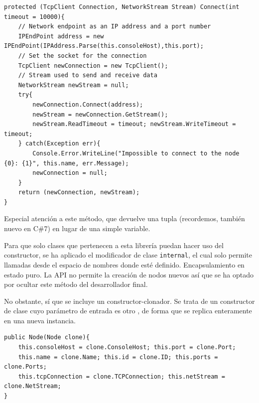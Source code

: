 \begin{lstlisting}[language={[Sharp]C}, caption={Establecimiento de la conexión con el nodo}, label={node2}]
protected (TcpClient Connection, NetworkStream Stream) Connect(int timeout = 10000){
    // Network endpoint as an IP address and a port number
    IPEndPoint address = new IPEndPoint(IPAddress.Parse(this.consoleHost),this.port);
    // Set the socket for the connection
    TcpClient newConnection = new TcpClient();
    // Stream used to send and receive data
    NetworkStream newStream = null;
    try{
        newConnection.Connect(address);
        newStream = newConnection.GetStream();
        newStream.ReadTimeout = timeout; newStream.WriteTimeout = timeout;
    } catch(Exception err){
        Console.Error.WriteLine("Impossible to connect to the node {0}: {1}", this.name, err.Message);
        newConnection = null;
    }
    return (newConnection, newStream);
}
\end{lstlisting}

Especial atención a este método, que devuelve una tupla (recordemos, también nuevo en C\#7) en lugar de una simple variable.

Para que solo clases que pertenecen a esta librería puedan hacer uso del constructor, se ha aplicado el modificador de clase \texttt{internal}, el cual solo permite llamadas desde el espacio de nombres donde esté definido. Encapsulamiento en estado puro. La API no permite la creación de nodos nuevos así que se ha optado por ocultar este método del desarrollador final.

No obstante, sí que se incluye un constructor-clonador. Se trata de un constructor de clase cuyo parámetro de entrada es otro \NODE, de forma que se replica enteramente en una nueva instancia.

\begin{lstlisting}[language={[Sharp]C}, caption={Clonador de nodos}, label={node2}]
public Node(Node clone){
    this.consoleHost = clone.ConsoleHost; this.port = clone.Port;
    this.name = clone.Name; this.id = clone.ID; this.ports = clone.Ports;
    this.tcpConnection = clone.TCPConnection; this.netStream = clone.NetStream;
}
\end{lstlisting}

